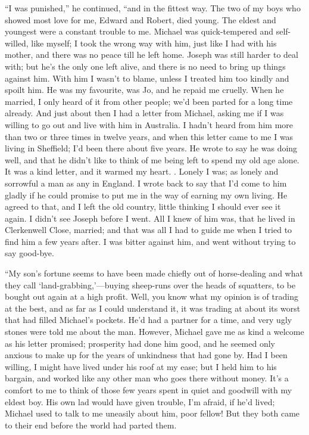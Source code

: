 {\protect\hypertarget{136}{}{}}``I was punished,'' he continued, ``and
in the fittest way. The two of my boys who showed most love for me,
Edward and Robert, died young. The eldest and youngest were a constant
trouble to me. Michael was quick-tempered and self-willed, like myself;
I took the wrong way with him, just like I had with his mother, and
there was no peace till he left home. Joseph was still harder to deal
with; but he's the only one left alive, and there is no need to bring up
things against him. With him I wasn't to blame, unless I treated him too
kindly and spoilt him. He was my favourite, was Jo, and he repaid me
cruelly. When he married, I only heard of it from other people; we'd
been parted for a long time already. And just about then I had a letter
from Michael, asking me if I was willing to go out and live with him in
Australia. I hadn't heard from him more than two or three times in
twelve years, and when this letter came to me I was living in Sheffield;
I'd been there about five years. He wrote to say he was
{\protect\hypertarget{137}{}{}}doing well, and that he didn't like to
think of me being left to spend my old age alone. It was a kind letter,
and it warmed my heart. . Lonely I was; as lonely and sorrowful a man as
any in England. I wrote back to say that I'd come to him gladly if he
could promise to put me in the way of earning my own living. He agreed
to that, and I left the old country, little thinking I should ever see
it again. I didn't see Joseph before I went. All I knew of him was, that
he lived in Clerkenwell Close, married; and that was all I had to guide
me when I tried to find him a few years after. I was bitter against him,
and went without trying to say good-bye.

``My son's fortune seems to have been made chiefly out of horse-dealing
and what they call `land-grabbing,'---buying sheep-runs over the heads
of squatters, to be bought out again at a high profit. Well, you know
what my opinion is of trading at the best, and as far as I could
understand it, it was trading at about its worst that had filled
Michael's pockets. He'd had a partner for
{\protect\hypertarget{138}{}{}}a time, and very ugly stones were told me
about the man. However, Michael gave me as kind a welcome as his letter
promised; prosperity had done him good, and he seemed only anxious to
make up for the years of unkindness that had gone by. Had I been
willing, I might have lived under his roof at my ease; but I held him to
his bargain, and worked like any other man who goes there without money.
It's a comfort to me to think of those few years spent in quiet and
goodwill with my eldest boy. His own lad would have given trouble, I'm
afraid, if he'd lived; Michael used to talk to me uneasily about him,
poor fellow! But they both came to their end before the world had parted
them.

